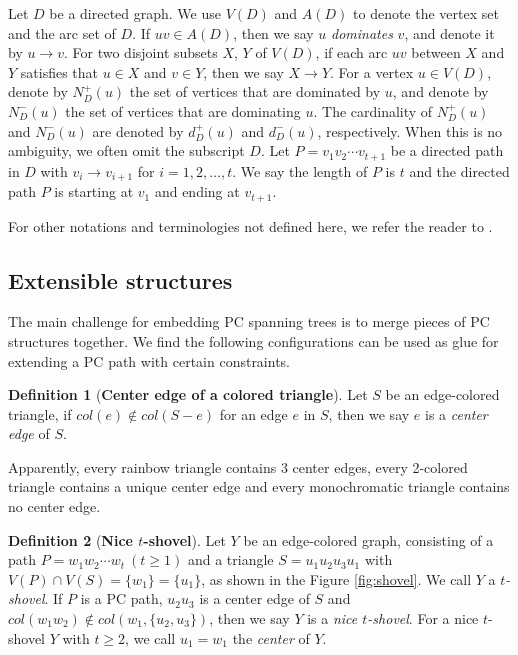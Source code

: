 \documentclass[10pt,a4paper]{article}
\theoremstyle{definition}
\newtheorem{definition}{Definition}
\begin{document}
Let $D$ be a directed graph. We use $V(D)$ and $A(D)$ to denote the vertex set and the arc set of $D$. If $uv\in A(D)$, then we say $u$ {\it dominates} $v$,  and denote it by $u \rightarrow v$. For two disjoint subsets $X$,  $Y$ of $V(D)$,  if each arc $uv$ between $X$ and $Y$ satisfies that $u\in X$ and $v\in Y$,  then we say $X \rightarrow Y $.   For a vertex $u\in V(D)$,  denote by $N^+_D(u)$ the set of vertices that are dominated by $u$,  and denote by $N^-_D(u)$ the set of vertices that are dominating $u$. The cardinality of $N^+_D(u)$ and $N^-_D(u)$ are denoted by $d^+_D(u)$ and $d^-_D(u)$, respectively. When this is no ambiguity, we often omit the subscript $D$. Let $P=v_1v_2\cdots v_{t+1}$ be a directed path in $D$ with $v_i \rightarrow v_{i+1}$ for $i=1,2,\ldots,t$. We say the length of $P$ is $t$ and the directed path $P$ is starting at $v_1$ and ending at $v_{t+1}$.

For other notations and terminologies not defined here, we refer the reader to \cite{bondy2008graph}.


\subsection{Extensible structures}
The main challenge for embedding PC spanning trees is to merge pieces of PC structures together. We find the following configurations can be used as glue for extending a PC path with certain constraints.

\begin{definition}[\textbf{Center edge of a colored triangle}]
Let $S$ be an edge-colored triangle, if
$col(e)\not\in col(S-e)$ for an edge $e$ in $S$, then we say $e$ is a \textit{center edge} of $S$.
\end{definition}
Apparently, every rainbow triangle contains $3$ center edges, every 2-colored triangle contains a unique center edge and every monochromatic triangle contains no center edge.

\begin{definition}[\textbf{Nice $t$-shovel}]
Let $Y$ be an edge-colored graph, consisting of a path $P=w_1w_2\cdots w_t~(t\geq 1)$ and a triangle $S=u_1u_2u_3u_1$ with $V(P)\cap V(S)=\{w_1\}=\{u_1\}$, as shown in the Figure \ref{fig:shovel}.  We call $Y$ a \textit{$t$-shovel}. If $P$ is a PC path, $u_2u_3$ is a center edge of $S$ and $col(w_1w_2)\not\in col\left(w_1,\{u_2,u_3\}\right)$, then we say $Y$ is a \textit{nice $t$-shovel}. For a nice $t$-shovel $Y$ with $t\geq 2$, we call $u_1=w_1$ the {\it center} of $Y$.
\end{definition}
\end{document}
